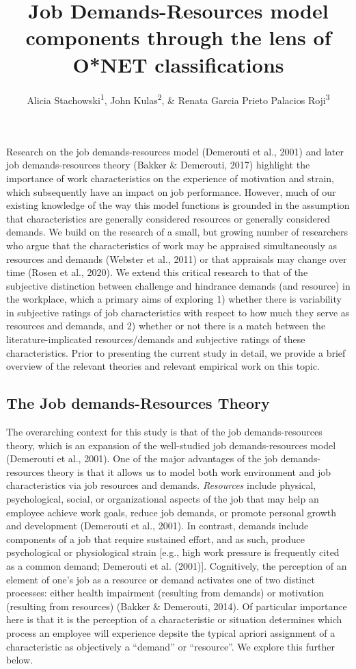 \documentclass[
  man]{apa6}
\title{Job Demands-Resources model components through the lens of O*NET classifications}
\author{Alicia Stachowski\textsuperscript{1}, John Kulas\textsuperscript{2}, \& Renata Garcia Prieto Palacios Roji\textsuperscript{3}}
\date{}
\affiliation{\vspace{0.5cm}\textsuperscript{1} University of Wisconsin - Stout\\\textsuperscript{2} eRg\\\textsuperscript{3} PepsiCo}
\begin{document}
\maketitle

Research on the job demands-resources model (Demerouti et al., 2001) and later job demands-resources theory (Bakker \& Demerouti, 2017) highlight the importance of work characteristics on the experience of motivation and strain, which subsequently have an impact on job performance. However, much of our existing knowledge of the way this model functions is grounded in the assumption that characteristics are generally considered resources or generally considered demands. We build on the research of a small, but growing number of researchers who argue that the characteristics of work may be appraised simultaneously as resources and demands (Webster et al., 2011) or that appraisals may change over time (Rosen et al., 2020). We extend this critical research to that of the subjective distinction between challenge and hindrance demands (and resource) in the workplace, which a primary aims of exploring 1) whether there is variability in subjective ratings of job characteristics with respect to how much they serve as resources and demands, and 2) whether or not there is a match between the literature-implicated resources/demands and subjective ratings of these characteristics. Prior to presenting the current study in detail, we provide a brief overview of the relevant theories and relevant empirical work on this topic.

\hypertarget{the-job-demands-resources-theory}{%
\subsection{The Job demands-Resources Theory}\label{the-job-demands-resources-theory}}

The overarching context for this study is that of the job demands-resources theory, which is an expansion of the well-studied job demands-resources model (Demerouti et al., 2001). One of the major advantages of the job demands-resources theory is that it allows us to model both work environment and job characteristics via job resources and demands. \emph{Resources} include physical, psychological, social, or organizational aspects of the job that may help an employee achieve work goals, reduce job demands, or promote personal growth and development (Demerouti et al., 2001). In contrast, demands include components of a job that require sustained effort, and as such, produce psychological or physiological strain {[}e.g., high work pressure is frequently cited as a common demand; Demerouti et al. (2001){]}. Cognitively, the perception of an element of one's job as a resource or demand activates one of two distinct processes: either health impairment (resulting from demands) or motivation (resulting from resources) (Bakker \& Demerouti, 2014). Of particular importance here is that it is the perception of a characteristic or situation determines which process an employee will experience depsite the typical apriori assignment of a characteristic as objectively a ``demand'' or ``resource''. We explore this further below.
\end{document}
